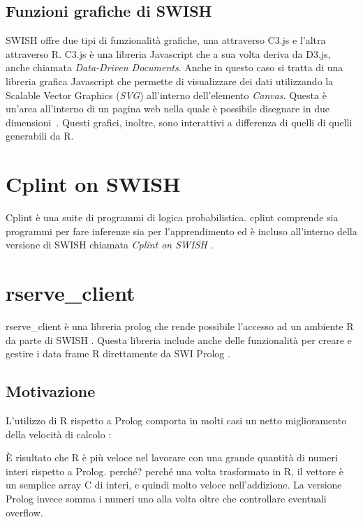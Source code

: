 \documentclass[10pt,titlepage,twoside,a4paper]{report}
\begin{document}
        \subsection{Funzioni grafiche di SWISH}
SWISH offre due tipi di funzionalità grafiche, una attraverso C3.js e l'altra
attraverso R. C3.js è una libreria Javascript che a sua volta deriva da
D3.js, anche chiamata \emph{Data-Driven Documents}. Anche in questo caso si 
tratta di una libreria grafica Javascript che permette di visualizzare
dei dati utilizzando la Scalable Vector Graphics (\emph{SVG}) all'interno 
dell'elemento \emph{Canvas}. Questa è un'area all'interno di un pagina web 
nella quale è possibile disegnare in due 
dimensioni\cite{canvasHtml}~\cite{d3js}. Questi grafici, inoltre, sono 
interattivi a differenza di quelli di quelli generabili da R.


\section{Cplint on SWISH}
Cplint è una suite di programmi di logica probabilistica. cplint comprende sia 
programmi per fare inferenze sia per l'apprendimento \cite{cplint} ed è 
incluso all'interno della versione di SWISH chiamata \emph{Cplint on SWISH} 
\cite{cplintOnSwish}.


    \section{rserve\_client}
rserve\_client è una libreria prolog che rende possibile 
l'accesso ad un ambiente R da parte di SWISH \cite{rserveClientDefinition} 
\cite{rserveclient}. Questa libreria include anche delle funzionalità per 
creare e gestire i data frame R direttamente da SWI Prolog 
\cite{swishRDataLibrary}.
    
        \subsection{Motivazione}
L'utilizzo di R rispetto a Prolog comporta in molti casi un netto miglioramento 
della velocità di calcolo \cite{rFaster}:
\begin{displayquote}
[..] È risultato che R è più veloce nel lavorare con una grande quantità
di numeri interi rispetto a Prolog. perché? perché una volta trasformato in R,
il vettore è un semplice array C di interi, e quindi molto veloce 
nell'addizione. La versione Prolog invece somma i numeri uno alla volta
oltre che controllare eventuali overflow.
\end{displayquote}
\end{document}
